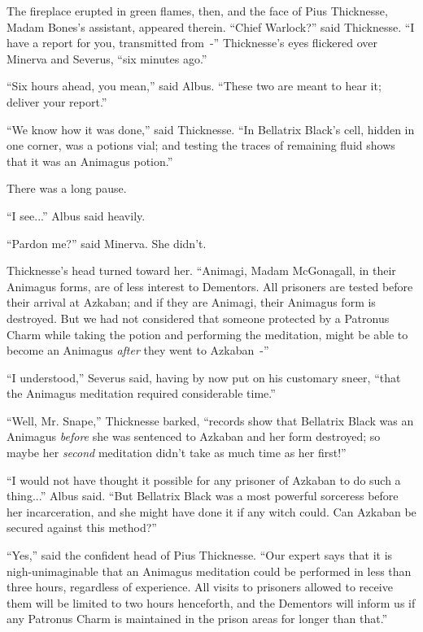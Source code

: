 The fireplace erupted in green flames, then, and the face of Pius Thicknesse, Madam Bones's assistant, appeared therein. ``Chief Warlock?'' said Thicknesse. ``I have a report for you, transmitted from~-'' Thicknesse's eyes flickered over Minerva and Severus, ``six minutes ago.''

``Six hours ahead, you mean,'' said Albus. ``These two are meant to hear it; deliver your report.''

``We know how it was done,'' said Thicknesse. ``In Bellatrix Black's cell, hidden in one corner, was a potions vial; and testing the traces of remaining fluid shows that it was an Animagus potion.''

There was a long pause.

``I see...'' Albus said heavily.

``Pardon me?'' said Minerva. She didn't.

Thicknesse's head turned toward her. ``Animagi, Madam McGonagall, in their Animagus forms, are of less interest to Dementors. All prisoners are tested before their arrival at Azkaban; and if they are Animagi, their Animagus form is destroyed. But we had not considered that someone protected by a Patronus Charm while taking the potion and performing the meditation, might be able to become an Animagus \emph{after} they went to Azkaban~-''

``I understood,'' Severus said, having by now put on his customary sneer, ``that the Animagus meditation required considerable time.''

``Well, Mr. Snape,'' Thicknesse barked, ``records show that Bellatrix Black was an Animagus \emph{before} she was sentenced to Azkaban and her form destroyed; so maybe her \emph{second} meditation didn't take as much time as her first!''

``I would not have thought it possible for any prisoner of Azkaban to do such a thing...'' Albus said. ``But Bellatrix Black was a most powerful sorceress before her incarceration, and she might have done it if any witch could. Can Azkaban be secured against this method?''

``Yes,'' said the confident head of Pius Thicknesse. ``Our expert says that it is nigh-unimaginable that an Animagus meditation could be performed in less than three hours, regardless of experience. All visits to prisoners allowed to receive them will be limited to two hours henceforth, and the Dementors will inform us if any Patronus Charm is maintained in the prison areas for longer than that.''

